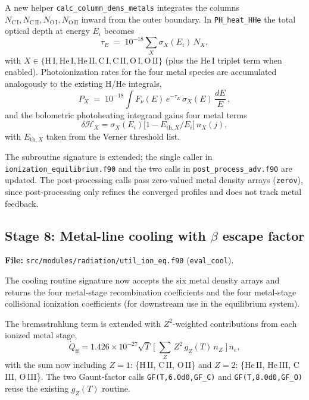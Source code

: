 \documentclass[english,a4paper]{kiseon_memo}
\begin{document}
A new helper \texttt{calc\_column\_dens\_metals} integrates the
columns \(N_{\mathrm{C\,I}}, N_{\mathrm{C\,II}}, N_{\mathrm{O\,I}},
N_{\mathrm{O\,II}}\) inward from the outer boundary.  In
\texttt{PH\_heat\_HHe} the total optical depth at energy \(E_i\)
becomes
\[
  \tau_E \;=\; 10^{-18}
  \sum_X \sigma_X(E_i)\, N_X,
\]
with \(X \in \{\mathrm{H\,I}, \mathrm{He\,I}, \mathrm{He\,II},
\mathrm{C\,I}, \mathrm{C\,II}, \mathrm{O\,I}, \mathrm{O\,II}\}\)
(plus the He\,I triplet term when enabled).  Photoionization rates
for the four metal species are accumulated analogously to the existing
H/He integrals,
\[
  P_X \;=\;
  10^{-18} \int F_\nu(E)\,e^{-\tau_E}\,
  \sigma_X(E)\, \frac{dE}{E}\,,
\]
and the bolometric photoheating integrand gains four metal terms
\[
  \delta\mathcal{H}_X = \sigma_X(E_i)\bigl[1 - E_{\mathrm{th},X}/E_i\bigr]\,
                       n_X(j),
\]
with \(E_{\mathrm{th},X}\) taken from the Verner threshold list.

The subroutine signature is extended; the single caller in
\texttt{ionization\_equilibrium.f90} and the two calls in
\texttt{post\_process\_adv.f90} are updated.  The post-processing
calls pass zero-valued metal density arrays
(\texttt{zerov}), since post-processing only refines the converged
profiles and does not track metal feedback.

\subsection{Stage 8: Metal-line cooling with $\beta$ escape factor}
\textbf{File:} \texttt{src/modules/radiation/util\_ion\_eq.f90}
(\texttt{eval\_cool}).

The cooling routine signature now accepts the six metal density arrays
and returns the four metal-stage recombination coefficients and the
four metal-stage collisional ionization coefficients (for downstream
use in the equilibrium system).

The bremsstrahlung term is extended with \(Z^{2}\)-weighted
contributions from each ionized metal stage,
\begin{equation}
\dot{Q}_{\mathrm{ff}} = 1.426\times10^{-27}\sqrt{T}\,
\Biggl[\;
\sum_{Z}\,Z^{2}\,g_{Z}(T)\,n_{Z}\;
\Biggr]\,n_{e},
\end{equation}
with the sum now including
\(Z=1\): \{H\,II, C\,II, O\,II\} and
\(Z=2\): \{He\,II, He\,III, C\,III, O\,III\}.
The two Gaunt-factor calls
\texttt{GF(T,6.0d0,GF\_C)} and
\texttt{GF(T,8.0d0,GF\_O)} reuse the existing
\(g_{Z}(T)\) routine.
\end{document}
